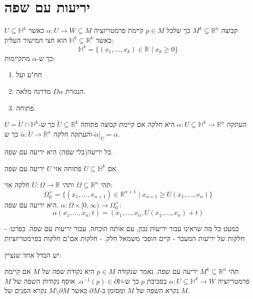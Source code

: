\documentclass{tstextbook}
\begin{document}
\section{יריעות עם שפה}

\begin{definition}
קבוצה \(M^{k}\subsetneq \mathbb{R}^{n}\) כך שלכל \(p \in M\) קיימת פרמטריזציה \(\alpha:U\to W\subseteq M\) כאשר \(U\subseteq \mathbb{H}^{k}\) כאשר \(\mathbb{H}^{k}\subseteq \mathbb{R}^{k}\) הוא חצי המישור העליון:
$$\mathbb{H} ^{k}=\{ (x_{1},\dots,x_{k})\in \mathbb{R}^{}\mid  x_{k}\geq  0 \}$$
כך ש-\(\alpha\) מתקיימות:

  \begin{enumerate}
    \item חח"ע ועל 


    \item הנגזרת \(D\alpha\) מדרגה מלאה. 


    \item פתוחה. 


  \end{enumerate}
\end{definition}
\begin{remark}
העתקה \(\alpha:U\subseteq \mathbb{H}^{k}\to \mathbb{R}^{n}\) היא חלקה אם קיימת קבוצה פתוחה \(\tilde{U} \subseteq \mathbb{R}^{k}\) כך ש-\(U=\tilde{U}\cap \mathbb{H^{k}}\) והעתקה חלקה \(\tilde{\alpha}:\tilde{U}\to \mathbb{R}^{n}\) כך ש-\(\tilde{\alpha}|_{U}=\alpha\).

\end{remark}
\begin{example}
כל יריעה(בלי שפה) היא יריעה עם שפה.

\end{example}
\begin{example}
אם \(U\subseteq \mathbb{H}^{k}\) פתוחה אזי \(U\) יריעה עם שפה.

\end{example}
\begin{example}
תהי \(\Omega \subseteq \mathbb{R}^{n}\) ותהי \(U:\Omega\to \mathbb{R}\) חלקה אזי:
$$\Omega_{0}^{+}=\{ (x_{1},\dots,x_{n+1})\in \mathbb{R}^{n+1}\mid  x_{n+1}\geq  U(x_{1},\dots,x_{n}) \}$$
היא יריעה עם שפה. \(\alpha:\Omega \times[0,\infty)\to \Omega_{0}^{+}\):
$$\alpha(x_{1},\dots,x_{n},t)=(x_{1},\dots,x_{n},U(x_{1},\dots,x_{n})+t)$$

\end{example}
כמעט כל מה שראינו עבור יריעות נכון, עם אותה הוכחה, עבור יריעות עם שפה. בפרט:
- חלקות של יריעות המעבר
- קיים הופכי משמאל חלק.
- חלקות אם"ם חלקות בפרמטריזציות

יש הבדל אחד שנציין:

\begin{definition}
תהי \(M^{k}\subseteq \mathbb{R}^{n}\) יריעה עם שפה. נאמר שנקודה \(p \in M\) היא נקודת שפה של \(M\) אם קיימת פרמטריזציה \(\alpha:U\subseteq \mathbb{H}^{k}\to W\) בסביבת \(p\) כך ש-\(\alpha ^{-1}(p)\in \partial \mathbb{H}\). אוסף נקודות השפה של \(M\) נקרא השפה של \(M\) ומסומן ב-\(\partial M\) כאשר \(M \setminus \partial M\) נקרא הפנים של \(M\).

\end{definition}
\end{document}
